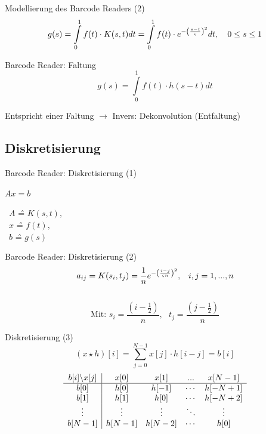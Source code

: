 \documentclass[11pt]{beamer}
\begin{document}
\begin{frame}{Modellierung des Barcode Readers (2)}
\[g(s) = \int\limits_{0}^1 f(t) \cdot K(s,t) dt = \int\limits_{0}^1 f(t) \cdot e^{-\left(s-t \over \varsigma\right)^2} dt, \, \, \, \, \, \, 0 \leq s \leq 1 \]
\end{frame}


\begin{frame}{Barcode Reader: Faltung}
\[
g(s) = \int\limits_{0}^1 f(t) \cdot h(s-t) dt
\]

Entspricht einer Faltung $\rightarrow$ Invers: Dekonvolution (Entfaltung)
\end{frame}


\subsection{Diskretisierung}
\begin{frame}{Barcode Reader: Diskretisierung (1)}

\begin{center}
$Ax = b$\\

\mbox{}
\mbox{}
\mbox{}

\,\,\,$A$ \^= $K(s,t),$\\
\,\,\,$x$ \^= $f(t),$\\
\,\,\,$b$ \^= $g(s)$
\end{center}


\end{frame}

\begin{frame}{Barcode Reader: Diskretisierung (2)}
\[
a_{ij} = K(s_i, t_j) = \frac{1}{n} e^{-\left(i-j \over \varsigma n\right)^2}, \,\,\,\,\, i,j = 1, ..., n
\]

\[\]

\[
\mbox{Mit: } s_i = \frac{(i- \frac{1}{2})}{n}, \,\,\,\, t_j = \frac{(j - \frac{1}{2})}{n}
\]
\end{frame}


\begin{frame}{Diskretisierung (3)}
\[
(x \star h)[i] = \sum\limits_{j=0}^{N-1} x[j] \cdot h[i-j] = b[i]
\]
\linebreak 
\[
\begin{array}{c|cccc}
b[i] \symbol{92} x[j] & x[0] & x[1] & ... & x[N-1]  \\
\hline
b[0]     & h[0] & h[-1] & \cdots & h[-N+1] \\
b[1]     & h[1] & h[0] & \cdots & h[-N+2]  \\
\vdots  & \vdots & \vdots & \ddots & \vdots \\
b[N-1] & h[N-1] & h[N-2] & \cdots & h[0]  \\
\end{array}
\]
\end{frame}
\end{document}
